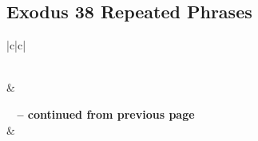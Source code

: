 \subsection{Exodus 38 Repeated Phrases}


\normalsize
 
\begin{center}
\begin{longtable}{|c|c|}
\caption[Exodus 38 Repeated Phrases]{Exodus 38 Repeated Phrases}\label{table:Repeated Phrases Exodus 38} \\
\hline {} &  \\ \hline 
\endfirsthead
 
{{\bfseries \tablename\ \thetable{} -- continued from previous page}} \\  
\hline {} &  \\ \hline 
\endhead
 

\end{longtable}
\end{center}
